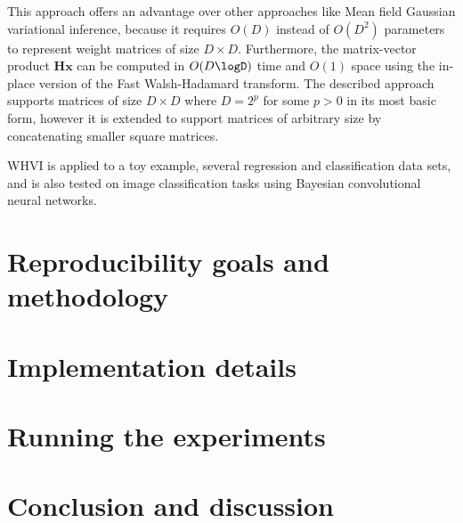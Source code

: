 \documentclass[11pt]{article}
\begin{document}
    This approach offers an advantage over other approaches like Mean field Gaussian variational inference, because it requires $O(D)$ instead of $O(D^2)$ parameters to represent weight matrices of size $D \times D$.
    Furthermore, the matrix-vector product $\mathbf{H}\mathbf{x}$ can be computed in $O(D \logD)$ time and $O(1)$ space using the in-place version of the Fast Walsh-Hadamard transform.
    The described approach supports matrices of size $D \times D$ where $D = 2^p$ for some $p > 0$ in its most basic form, however it is extended to support matrices of arbitrary size by concatenating smaller square matrices.

    WHVI is applied to a toy example, several regression and classification data sets, and is also tested on image classification tasks using Bayesian convolutional neural networks.


    \section{Reproducibility goals and methodology}\label{sec:reproducibility-goals}


    \section{Implementation details}\label{sec:implementation-details}


    \section{Running the experiments}\label{sec:running-the-experiments}


    \section{Conclusion and discussion}\label{sec:conclusion-and-discussion}
\end{document}
